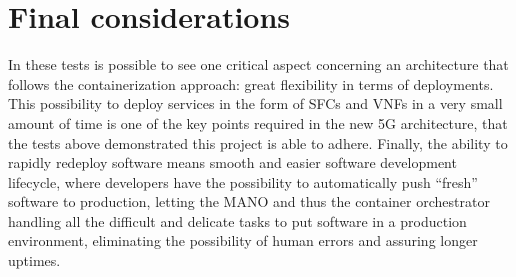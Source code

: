 \section{Final considerations}

In these tests is possible to see one critical aspect concerning an architecture
that follows the containerization approach: great flexibility in terms of
deployments. This possibility to deploy services in the form of SFCs and VNFs in
a very small amount of time is one of the key points required in the new 5G
architecture, that the tests above demonstrated this project is able to adhere.
Finally, the ability to rapidly redeploy software means smooth and easier
software development lifecycle, where developers have the possibility to
automatically push ``fresh'' software to production, letting the MANO and thus
the container orchestrator handling all the difficult and delicate tasks to put
software in a production environment, eliminating the possibility of human
errors and assuring longer uptimes.
